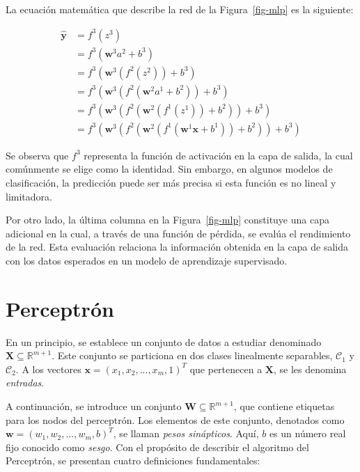 \documentclass[
  us-letterpaper,
]{scrreprt}
\theoremstyle{definition}
\theoremstyle{plain}
\theoremstyle{plain}
\theoremstyle{definition}
\theoremstyle{remark}
\begin{document}
La ecuación matemática que describe la red de la Figura~\ref{fig-mlp} es
la siguiente:

\[
\begin{split}\hat{\mathbf{y}} &= f^3(z^3) \\&= f^3(\mathbf{w}^3 a^2 + b^3) \\&= f^3(\mathbf{w}^3 (f^2(z^2)) + b^3) \\&= f^3(\mathbf{w}^3 (f^2(\mathbf{w}^2 a^1 + b^2)) + b^3) \\&= f^3(\mathbf{w}^3 (f^2(\mathbf{w}^2 (f^1(z^1)) + b^2)) + b^3) \\&= f^3(\mathbf{w}^3 (f^2(\mathbf{w}^2 (f^1(\mathbf{w}^1 \mathbf{x} + b^1)) + b^2)) + b^3)\end{split}
\]

Se observa que \(f^3\) representa la función de activación en la capa de
salida, la cual comúnmente se elige como la identidad. Sin embargo, en
algunos modelos de clasificación, la predicción puede ser más precisa si
esta función es no lineal y limitadora.

Por otro lado, la última columna en la Figura~\ref{fig-mlp} constituye
una capa adicional en la cual, a través de una función de pérdida, se
evalúa el rendimiento de la red. Esta evaluación relaciona la
información obtenida en la capa de salida con los datos esperados en un
modelo de aprendizaje supervisado.

\section{Perceptrón}\label{perceptruxf3n}

En un principio, se establece un conjunto de datos a estudiar denominado
\(\mathbf X \subseteq \mathbb R^{m+1}\). Este conjunto se particiona en
dos clases linealmente separables, \(\mathscr C_1\) y \(\mathscr C_2\).
A los vectores \(\mathbf x = (x_1, x_2,...,x_m,1)^T\) que pertenecen a
\(\mathbf X\), se les denomina \emph{entradas}.

A continuación, se introduce un conjunto
\(\mathbf W \subseteq \mathbb R^{m+1}\), que contiene etiquetas para los
nodos del perceptrón. Los elementos de este conjunto, denotados como
\(\mathbf w = (w_1,w_2,...,w_m,b)^T\), se llaman \emph{pesos
sinápticos}. Aquí, \(b\) es un número real fijo conocido como
\emph{sesgo}. Con el propósito de describir el algoritmo del Perceptrón,
se presentan cuatro definiciones fundamentales:
\end{document}

